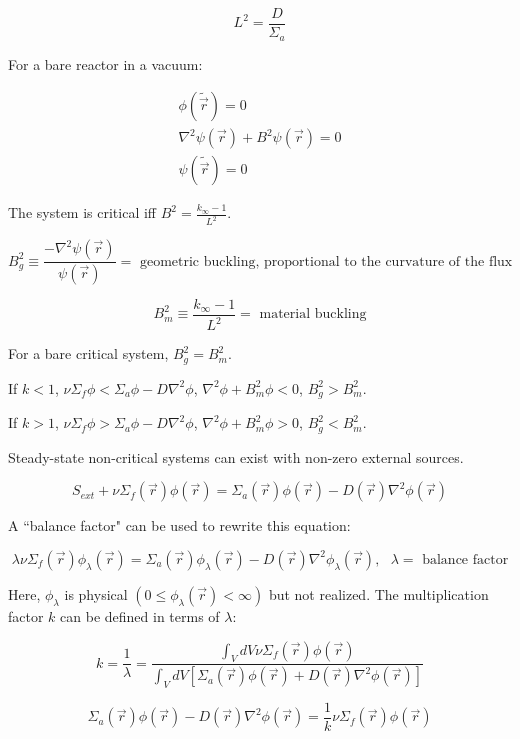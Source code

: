 \documentclass[12pt]{article}
\newcommand{\rvec}{\ensuremath{\vec{r}}}
\newcommand{\vecr}{\ensuremath{\vec{r}}}
\begin{document}
\begin{equation*}
L^2 = \frac{D}{\Sigma_a}
\end{equation*}

For a bare reactor in a vacuum:

\begin{gather*}
\phi(\tilde{\rvec}) = 0 \\
\nabla^2\psi(\rvec) + B^2\psi(\rvec) = 0 \\
\psi(\tilde{\rvec}) = 0
\end{gather*}

The system is critical iff $B^2 = \frac{k_{\infty} - 1}{L^2}$.

\begin{equation*}
B_g^2 \equiv \frac{-\nabla^2\psi(\rvec)}{\psi(\vecr)} = 
\text{ geometric buckling, proportional to the curvature of the flux}
\end{equation*}

\begin{equation*}
B_m^2 \equiv \frac{k_{\infty} - 1}{L^2} = \text{ material buckling}
\end{equation*}

For a bare critical system, $B_g^2 = B_m^2$.


If $k < 1$, $\nu\Sigma_f\phi < \Sigma_a\phi - D\nabla^2\phi$, $\nabla^2\phi + B_m^2\phi < 0$, 
$B_g^2 > B_m^2$.


If $k > 1$, $\nu\Sigma_f\phi > \Sigma_a\phi - D\nabla^2\phi$, $\nabla^2\phi + B_m^2\phi > 0$, 
$B_g^2 < B_m^2$.


Steady-state non-critical systems can exist with non-zero external sources.

\begin{equation*}
S_{ext} + \nu\Sigma_f(\rvec)\phi(\rvec) = \Sigma_a(\rvec)\phi(\rvec) - D(\rvec)\nabla^2\phi(\rvec)
\end{equation*}

A ``balance factor" can be used to rewrite this equation:

\begin{equation*}
\lambda\nu\Sigma_f(\rvec)\phi_{\lambda}(\rvec) = 
\Sigma_a(\rvec)\phi_{\lambda}(\rvec) - D(\rvec)\nabla^2\phi_{\lambda}(\rvec), 
\text{ $\lambda =$ balance factor}
\end{equation*}

Here, $\phi_{\lambda}$ is physical $(0\leq\phi_{\lambda}(\rvec)<\infty)$ but not realized. The
multiplication factor $k$ can be defined in terms of $\lambda$:

\begin{equation*}
k = \frac{1}{\lambda} = 
\frac{\int_VdV\nu\Sigma_f(\rvec)\phi(\rvec)}{\int_VdV[\Sigma_a(\rvec)\phi(\rvec)+D(\rvec)\nabla^2\phi(\rvec)]}
\end{equation*}

\begin{equation*}
\Sigma_a(\rvec)\phi(\rvec) - D(\rvec)\nabla^2\phi(\rvec) = \frac{1}{k}\nu\Sigma_f(\rvec)\phi(\rvec)
\end{equation*}

\end{document}

